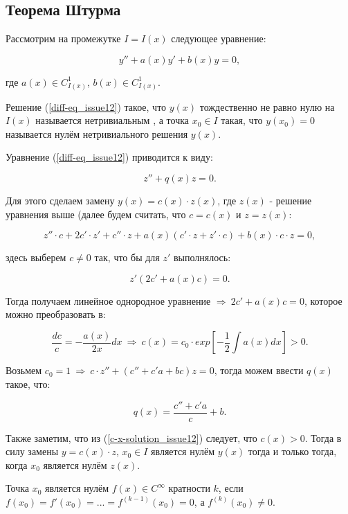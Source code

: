 \subsection{Теорема Штурма}

Рассмотрим на промежутке $I = I(x)$ следующее уравнение:

\begin{equation}\label{diff-eq_issue12}
y'' + a(x)y' + b(x)y = 0,
\end{equation}

где $a(x) \in C^1_{I(x)}$, $b(x) \in C^1_{I(x)}$.

Решение (\ref{diff-eq_issue12}) такое, что $y(x)$ тождественно не равно нулю на $I(x)$ называется нетривиальным , а точка $x_0 \in I$ такая, что $y(x_0) = 0$ называется нулём нетривиального решения $y(x)$.

Уравнение (\ref{diff-eq_issue12}) приводится к виду:

\begin{equation}\label{diff-eq_z-form_issue12}
z'' + q(x)z = 0.
\end{equation}

Для этого сделаем замену $y(x) = c(x) \cdot z(x)$, где $z(x)$ - решение уравнения выше (далее будем считать, что $c = c(x)$ и $z = z(x)$:

\[z''\cdot c + 2c' \cdot z' + c'' \cdot z + a(x) (c' \cdot z + z' \cdot c) + b(x) \cdot c \cdot z = 0,\]

здесь выберем $c \neq 0$ так, что бы для $z'$ выполнялось:

\[z' (2c' + a(x) c) = 0.\]

Тогда получаем линейное однородное уравнение $\Rightarrow \: 2c' + a(x)c = 0$, которое можно преобразовать в:

\begin{equation}\label{c-x-solution_issue12}
\frac{dc}{c} = - \frac{a(x)}{2x}dx\: \Rightarrow \: c(x) = c_0 \cdot exp \left[-\frac{1}{2} \int a(x)dx\right] > 0.
\end{equation}

Возьмем $c_0 = 1 \: \Rightarrow \: c \cdot z'' + (c'' + c'a + bc)z = 0$, тогда можем ввести $q(x)$ такое, что:

\[q(x) = \frac{c'' + c'a}{c} + b.\]

Также заметим, что из (\ref{c-x-solution_issue12}) следует, что $c(x) > 0$. Тогда в силу замены $y = c(x) \cdot z$, $x_0 \in I$ является нулём $y(x)$ тогда и только тогда, когда $x_0$ является нулём $z(x)$.

\begin{definition}
Точка $x_0$ является нулём $f(x) \in C^{\infty}$ кратности $k$, если $f(x_0) = f'(x_0) = ... = f^{(k-1)}(x_0) = 0$, а $f^{(k)}(x_0) \neq 0$.
\end{definition}

